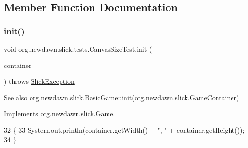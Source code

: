 \subsection{Member Function Documentation}
\mbox{\label{classorg_1_1newdawn_1_1slick_1_1tests_1_1_canvas_size_test_adb93eb9115df42cdb26ddbc76c8bd4cb}} 
\subsubsection{\texorpdfstring{init()}{init()}}
{\footnotesize\ttfamily void org.\+newdawn.\+slick.\+tests.\+Canvas\+Size\+Test.\+init (\begin{DoxyParamCaption}\item[{\mbox{\hyperlink{classorg_1_1newdawn_1_1slick_1_1_game_container}{Game\+Container}}}]{container }\end{DoxyParamCaption}) throws \mbox{\hyperlink{classorg_1_1newdawn_1_1slick_1_1_slick_exception}{Slick\+Exception}}\hspace{0.3cm}{\ttfamily [inline]}}

\begin{DoxySeeAlso}{See also}
\mbox{\hyperlink{classorg_1_1newdawn_1_1slick_1_1_basic_game_a8af0900217e4d389249f71367b22d114}{org.\+newdawn.\+slick.\+Basic\+Game\+::init}}(\mbox{\hyperlink{classorg_1_1newdawn_1_1slick_1_1_game_container}{org.\+newdawn.\+slick.\+Game\+Container}}) 
\end{DoxySeeAlso}


Implements \mbox{\hyperlink{interfaceorg_1_1newdawn_1_1slick_1_1_game_ad2dd6affab08bb8fdb5fab0815957b7a}{org.\+newdawn.\+slick.\+Game}}.


\begin{DoxyCode}
32                                                                     \{
33         System.out.println(container.getWidth() + \textcolor{stringliteral}{", "} + container.getHeight());
34     \}
\end{DoxyCode}
\mbox{\label{classorg_1_1newdawn_1_1slick_1_1tests_1_1_canvas_size_test_ae2f3f1d8c976dd08a2cca0cb6b5a878e}} 

